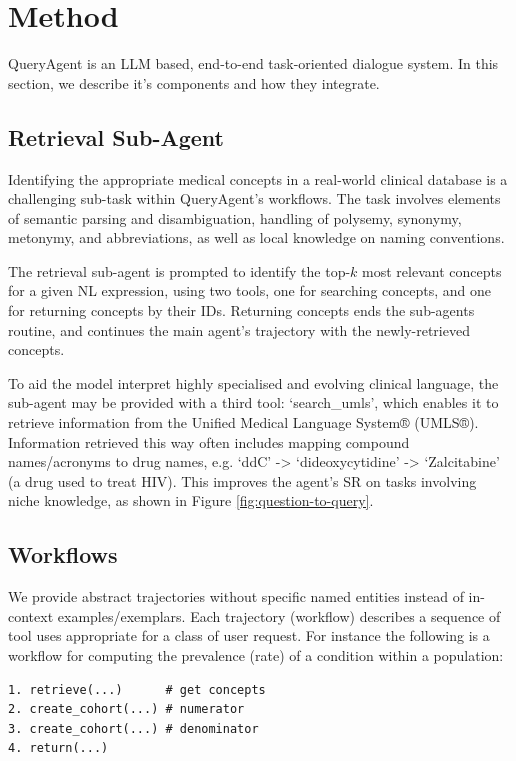 \documentclass[11pt]{article}
\begin{document}
\section{Method}

QueryAgent is an LLM based, end-to-end task-oriented dialogue system.
In this section, we describe it's components and how they integrate.

\subsection{Retrieval Sub-Agent}
Identifying the appropriate medical concepts in a real-world clinical database is a challenging sub-task within QueryAgent's workflows.
The task involves elements of semantic parsing and disambiguation, handling of polysemy, synonymy, metonymy, and abbreviations, as well as local knowledge on naming conventions.

The retrieval sub-agent is prompted to identify the top-$k$ most relevant concepts for a given NL expression, using two tools, one for searching concepts, and one for returning concepts by their IDs.
Returning concepts ends the sub-agents routine, and continues the main agent's trajectory with the newly-retrieved concepts.

To aid the model interpret highly specialised and evolving clinical language, the sub-agent may be provided with a third tool: `search\_umls', which enables it to retrieve information from the Unified Medical Language System® (UMLS®).
Information retrieved this way often includes mapping compound names/acronyms to drug names, e.g. `ddC' -> `dideoxycytidine' -> `Zalcitabine' (a drug used to treat HIV).
This improves the agent's SR on tasks involving niche knowledge, as shown in Figure \ref{fig:question-to-query}.

\subsection{Workflows}

We provide abstract trajectories without specific named entities instead of in-context examples/exemplars.
Each trajectory (workflow) describes a sequence of tool uses appropriate for a class of user request.
For instance the following is a workflow for computing the prevalence (rate) of a condition within a population:
\begin{verbatim}
1. retrieve(...)      # get concepts
2. create_cohort(...) # numerator
3. create_cohort(...) # denominator
4. return(...)
\end{verbatim}
\end{document}
